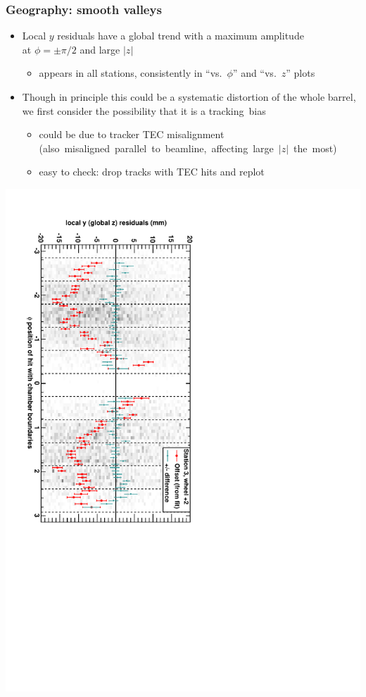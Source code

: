 \documentclass[compress]{beamer}
\begin{document}

\begin{frame}
\frametitle{Geography: smooth valleys}
\begin{itemize}
\item Local $y$ residuals have a global trend with a maximum amplitude \\ at $\phi = \pm\pi/2$ and large $|z|$
\begin{itemize}
\item appears in all stations, consistently in ``vs.\ $\phi$'' and ``vs.\ $z$'' plots
\end{itemize}
\item Though in principle this could be a systematic distortion of the
  whole barrel, we first consider the possibility that it is a
  \mbox{tracking bias\hspace{-0.5 cm}}
\begin{itemize}
\item could be due to tracker TEC misalignment \\ \mbox{(also misaligned parallel to beamline, affecting large $|z|$ the most)\hspace{-1 cm}}
\item easy to check: drop tracks with TEC hits and replot
\end{itemize}
\end{itemize}

\vspace{-0.4 cm}
\begin{center}
\includegraphics[height=0.83\linewidth, angle=90]{DTzVsPhi_st3_whE.pdf}
\end{center}
\end{frame}
\end{document}
